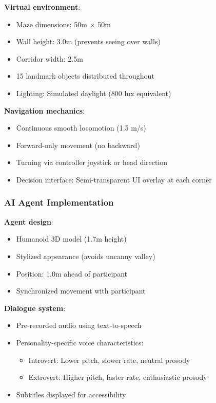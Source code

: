 \documentclass[12pt]{article}
\begin{document}
\textbf{Virtual environment}:
\begin{itemize}
    \item Maze dimensions: 50m $\times$ 50m
    \item Wall height: 3.0m (prevents seeing over walls)
    \item Corridor width: 2.5m
    \item 15 landmark objects distributed throughout
    \item Lighting: Simulated daylight (800 lux equivalent)
\end{itemize}

\textbf{Navigation mechanics}:
\begin{itemize}
    \item Continuous smooth locomotion (1.5 m/s)
    \item Forward-only movement (no backward)
    \item Turning via controller joystick or head direction
    \item Decision interface: Semi-transparent UI overlay at each corner
\end{itemize}

\subsubsection{AI Agent Implementation}

\textbf{Agent design}:
\begin{itemize}
    \item Humanoid 3D model (1.7m height)
    \item Stylized appearance (avoids uncanny valley)
    \item Position: 1.0m ahead of participant
    \item Synchronized movement with participant
\end{itemize}

\textbf{Dialogue system}:
\begin{itemize}
    \item Pre-recorded audio using text-to-speech
    \item Personality-specific voice characteristics:
    \begin{itemize}
        \item Introvert: Lower pitch, slower rate, neutral prosody
        \item Extrovert: Higher pitch, faster rate, enthusiastic prosody
    \end{itemize}
    \item Subtitles displayed for accessibility
\end{itemize}
\end{document}
